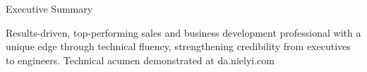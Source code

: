 \documentclass[
	11pt, %
]{resume} %
\begin{document}

\begin{rSection}{Executive Summary}
\begin {rSubsection} {}{}{}{}

   \item Results-driven, top-performing sales and business development professional with a unique edge through technical fluency, strengthening credibility from executives to engineers. Technical acumen demonstrated at da.nielyi.com


    \end {rSubsection}
\end{rSection}

\end{document}
